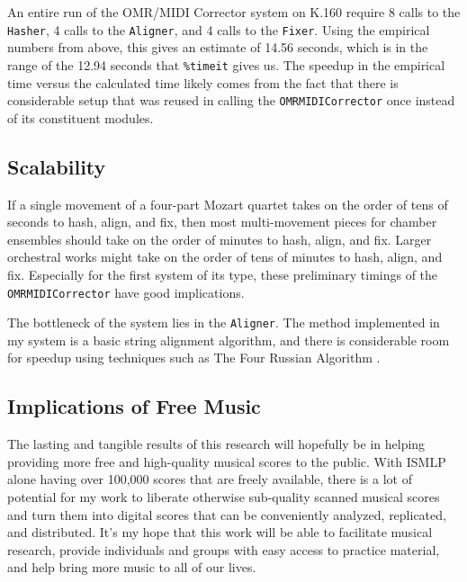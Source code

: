 An entire run of the OMR/MIDI Corrector system on K.160 require 8 calls to the \texttt{Hasher}, 4 calls to the \texttt{Aligner}, and 4 calls to the \texttt{Fixer}. Using the empirical numbers from above, this gives an estimate of 14.56 seconds, which is in the range of the 12.94 seconds that \texttt{\%timeit} gives us. The speedup in the empirical time versus the calculated time likely comes from the fact that there is considerable setup that was reused in calling the \texttt{OMRMIDICorrector} once instead of its constituent modules. 

\subsection{Scalability}
If a single movement of a four-part Mozart quartet takes on the order of tens of seconds to hash, align, and fix, then most multi-movement pieces for chamber ensembles should take on the order of minutes to hash, align, and fix. Larger orchestral works might take on the order of tens of minutes to hash, align, and fix. Especially for the first system of its type, these preliminary timings of the \texttt{OMRMIDICorrector} have good implications. 

The bottleneck of the system lies in the \texttt{Aligner}. The method implemented in my system is a basic string alignment algorithm, and there is considerable room for speedup using techniques such as The Four Russian Algorithm \cite{seqalign}. 

\subsection{Implications of Free Music}
The lasting and tangible results of this research will hopefully be in helping providing more free and high-quality musical scores to the public. With ISMLP alone having over 100,000 scores that are freely available, there is a lot of potential for my work to liberate otherwise sub-quality scanned musical scores and turn them into digital scores that can be conveniently analyzed, replicated, and distributed. It's my hope that this work will be able to facilitate musical research, provide individuals and groups with easy access to practice material, and help bring more music to all of our lives.
